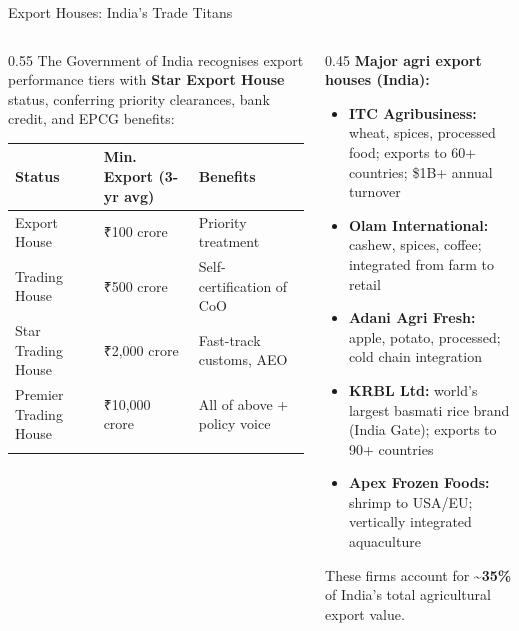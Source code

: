 \documentclass[
  ignorenonframetext,
  aspectratio=169,
]{beamer}
\makeatletter
\providecommand{\tightlist}{%
  \setlength{\itemsep}{0pt}\setlength{\parskip}{0pt}}
\let\quarto@originallabel\label
\DeclareRobustCommand*{\label}[1]{\quarto@originallabel{#1}}
\makeatother
\begin{document}
\begin{frame}
\begin{block}{Export Houses: India's Trade Titans}
\label{export-houses-indias-trade-titans}
\begin{columns}[T]
\begin{column}{0.55\linewidth}
The Government of India recognises export performance tiers with
\textbf{Star Export House} status, conferring priority clearances, bank
credit, and EPCG benefits:

\begin{longtable}[]{@{}lll@{}}
\toprule\noalign{}
Status & Min. Export (3-yr avg) & Benefits \\
\midrule\noalign{}
\endhead
Export House & ₹100 crore & Priority treatment \\
Trading House & ₹500 crore & Self-certification of CoO \\
Star Trading House & ₹2,000 crore & Fast-track customs, AEO \\
Premier Trading House & ₹10,000 crore & All of above + policy voice \\
\bottomrule\noalign{}
\end{longtable}
\end{column}

\begin{column}{0.45\linewidth}
\textbf{Major agri export houses (India):}

\begin{itemize}
\tightlist
\item
  \textbf{ITC Agribusiness:} wheat, spices, processed food; exports to
  60+ countries; \$1B+ annual turnover
\item
  \textbf{Olam International:} cashew, spices, coffee; integrated from
  farm to retail
\item
  \textbf{Adani Agri Fresh:} apple, potato, processed; cold chain
  integration
\item
  \textbf{KRBL Ltd:} world's largest basmati rice brand (India Gate);
  exports to 90+ countries
\item
  \textbf{Apex Frozen Foods:} shrimp to USA/EU; vertically integrated
  aquaculture
\end{itemize}

These firms account for \textbf{\textasciitilde35\%} of India's total
agricultural export value.
\end{column}
\end{columns}
\end{block}
\end{frame}
\end{document}
